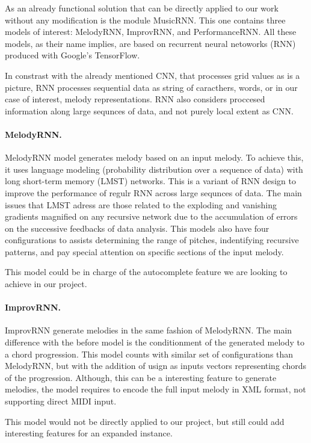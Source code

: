 As an already functional solution that can be directly applied to our work without any
modification is the module MusicRNN\autocite{musicRNN}. This one contains three models of
interest: MelodyRNN, ImprovRNN, and PerformanceRNN. All these models, as their name
implies, are based on recurrent neural netoworks (RNN) produced with Google's TensorFlow.

In constrast with the already mentioned CNN, that processes grid values as is a picture, 
RNN processes sequential data as string of caracthers, words, or in our case of 
interest, melody representations. RNN also considers proccesed information along large
sequnces of data, and not purely local extent as CNN.\autocite{fundamentalML}

\paragraph{MelodyRNN.}
MelodyRNN model generates melody based on an input melody. To achieve this, it uses
language modeling (probability distribution over a sequence of data) with long short-term
memory (LMST) networks. This is a variant of RNN design to improve the performance of
regulr RNN across large sequnces of data. The main issues that LMST adress are those
related to the exploding and vanishing gradients magnified on any recursive network due to
the accumulation of errors on the successive feedbacks of data analysis. This models also
have four configurations to assists determining the range of pitches, indentifying
recursive patterns, and pay special attention on specific sections of the input melody.
\autocite{melodyRNN} 

This model could be in charge of the autocomplete feature we are
looking to achieve in our project.

\paragraph{ImprovRNN.}
ImprovRNN generate melodies in the same fashion of MelodyRNN. The main difference with the
before model is the conditionment of the generated melody to a chord progression. This
model counts with similar set of configurations than MelodyRNN, but with the addition of
usign as inputs vectors representing chords of the progression. Although, this can be a
interesting feature to generate melodies, the model requires to encode the full input
melody in XML format, not supporting direct MIDI input.\autocite{improvRNN} 

This model would not be directly applied to our project, but still could add interesting
features for an expanded instance.

